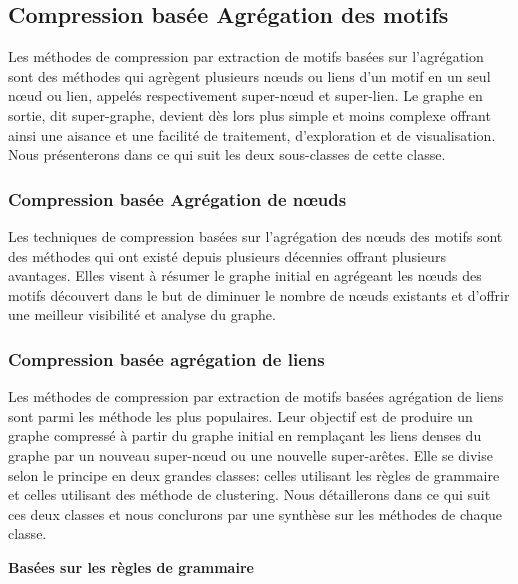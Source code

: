 \documentclass[a4paper,oneside,12pt]{report}
\theoremstyle{definition}
\begin{document}
				\subsection{Compression basée Agrégation des motifs}
				
					Les méthodes de compression par extraction de motifs basées sur l'agrégation sont des méthodes   qui agrègent plusieurs nœuds ou liens d'un motif en un seul nœud ou lien, appelés respectivement super-nœud et super-lien. Le graphe en sortie, dit super-graphe, devient dès lors plus simple et moins complexe offrant ainsi une aisance et une facilité de traitement, d'exploration et de visualisation. Nous présenterons dans ce qui suit les deux sous-classes de cette classe. 
					
										 
					\subsubsection{Compression basée Agrégation de nœuds}
					
					Les techniques de compression basées sur l'agrégation des nœuds des motifs sont des méthodes qui ont existé depuis plusieurs décennies offrant plusieurs avantages. 
					Elles visent à résumer le graphe initial en agrégeant les nœuds des motifs découvert dans le but de diminuer le nombre de nœuds existants  et d'offrir une meilleur visibilité et analyse du graphe. 
						
						
						
						
					\subsubsection{Compression basée agrégation de liens}
						Les méthodes de compression par extraction de motifs basées agrégation de liens sont parmi les méthode les plus populaires. Leur objectif est de produire un graphe compressé à partir du graphe initial en remplaçant les liens denses du graphe par un nouveau super-nœud ou une nouvelle super-arêtes. Elle se divise selon le principe en deux grandes classes: celles utilisant les règles de grammaire et celles utilisant des méthode de clustering. Nous détaillerons dans ce qui suit ces deux classes et nous conclurons par une synthèse sur les méthodes de chaque classe.
						
						 \textbf{Basées sur les règles de grammaire} 
								
\end{document}
